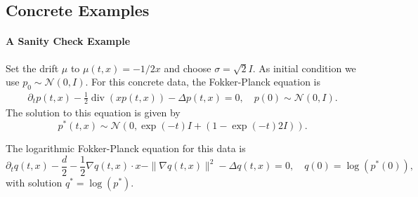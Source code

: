 \subsection{Concrete Examples}
\paragraph{A Sanity Check Example}
Set the drift $\mu$ to $\mu(t,x) = -1/2x$ and choose $\sigma=\sqrt 2 I$. As initial condition we use $p_0 \sim \mathcal N(0,I)$. For this concrete data, the Fokker-Planck equation is
\begin{align}\label{eq:fokker_planck_sanity_example}
    \partial_t p(t, x)
    -
    \frac12 \operatorname{div}(xp(t,x))
    -
    \Delta p(t,x)
    =
    0,
    \quad 
    p(0) \sim \mathcal N(0, I).
\end{align}
The solution to this equation is given by
\begin{equation}
    p^*(t, x) \sim \mathcal N(0, \exp(-t)I + (1 - \exp(-t) 2 I)).
\end{equation}

The logarithmic Fokker-Planck equation for this data is 
\begin{equation}
    \partial_t q(t,x)
    -
    \frac d2
    -
    \frac12\nabla q(t,x)\cdot x
    -
    \| \nabla q(t,x) \|^2
    -
    \Delta q(t,x)
    =
    0,
    \quad 
    q(0) = \log(p^*(0)),
\end{equation}
with solution $q^* = \log(p^*)$.

